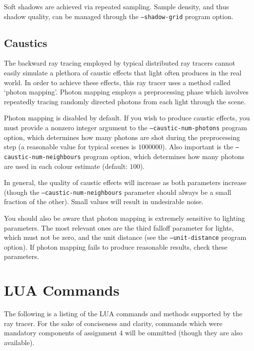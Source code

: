 \documentclass{article}
\begin{document}
Soft shadows are achieved via repeated sampling. Sample density, and thus shadow
quality, can be managed through the {\tt --shadow-grid} program option.

\subsection{Caustics}
\label{caustics}

The backward ray tracing employed by typical distributed ray tracers cannot
easily simulate a plethora of caustic effects that light often produces in the
real world. In order to achieve these effects, this ray tracer uses a method
called `photon mapping'. Photon mapping employs a preprocessing phase which
involves repeatedly tracing randomly directed photons from each light through
the scene.

Photon mapping is disabled by default. If you wish to produce caustic effects,
you must provide a nonzero integer argument to the {\tt --caustic-num-photons}
program option, which determines how many photons are shot during the
preprocessing step (a reasonable value for typical scenes is $1000000$). Also
important is the {\tt --caustic-num-neighbours} program option, which determines
how many photons are used in each colour estimate (default: $100$).

In general, the quality of caustic effects will increase as both parameters
increase (though the {\tt --caustic-num-neighbours} parameter should always be a
small fraction of the other). Small values will result in undesirable noise.

You should also be aware that photon mapping is extremely sensitive to lighting
parameters. The most relevant ones are the third falloff parameter for lights,
which must not be zero, and the unit distance (see the {\tt --unit-distance} program
option). If photon mapping fails to produce reasonable results, check these
parameters.

\section{LUA Commands}
\label{lua_commands}

The following is a listing of the LUA commands and methods supported by the ray
tracer. For the sake of conciseness and clarity, commands which were mandatory
components of assignment 4 will be ommitted (though they are also available).
\end{document}
